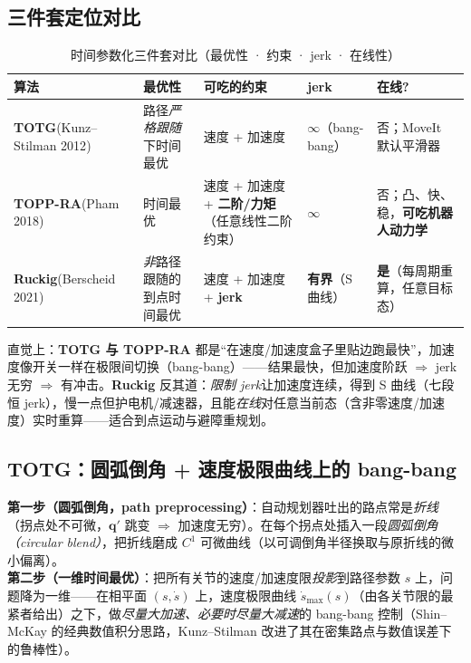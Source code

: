 \subsection{三件套定位对比}
\label{subsec:at-trio}

\begin{table}[H]\centering\small
\caption{时间参数化三件套对比（最优性 · 约束 · jerk · 在线性）}
\label{tab:at-trio}
\begin{tabular}{p{} p{} p{} p{} p{}}
\toprule
算法 & 最优性 & 可吃的约束 & jerk & 在线? \\
\midrule
\textbf{TOTG}\newline (Kunz--Stilman 2012\cite{kunz2012totg}) & 路径\emph{严格跟随}下时间最优 & 速度 + 加速度 & $\infty$（bang-bang） & 否；MoveIt 默认平滑器 \\
\textbf{TOPP-RA}\newline (Pham 2018\cite{pham2018toppra}) & 时间最优 & 速度 + 加速度 + \textbf{二阶/力矩}（任意线性二阶约束） & $\infty$ & 否；凸、快、稳，\textbf{可吃机器人动力学} \\
\textbf{Ruckig}\newline (Berscheid 2021\cite{berscheid2021ruckig}) & \emph{非}路径跟随的到点时间最优 & 速度 + 加速度 + \textbf{jerk} & \textbf{有界}（S 曲线） & \textbf{是}（每周期重算，任意目标态） \\
\bottomrule
\end{tabular}
\end{table}

直觉上：\textbf{TOTG 与 TOPP-RA} 都是“在速度/加速度盒子里贴边跑最快”，加速度像开关一样在极限间切换（bang-bang）——结果最快，但加速度阶跃 $\Rightarrow$ jerk 无穷 $\Rightarrow$ 有冲击。\textbf{Ruckig} 反其道：\emph{限制 jerk}让加速度连续，得到 S 曲线（七段恒 jerk），慢一点但护电机/减速器，且能\emph{在线}对任意当前态（含非零速度/加速度）实时重算——适合到点运动与避障重规划。

\subsection{TOTG：圆弧倒角 + 速度极限曲线上的 bang-bang}
\label{subsec:at-totg}

\begin{algo}\label{alg:at-totg}
\textbf{第一步（圆弧倒角，path preprocessing）}：自动规划器吐出的路点常是\emph{折线}（拐点处不可微，$\mathbf{q}'$ 跳变 $\Rightarrow$ 加速度无穷）。在每个拐点处插入一段\emph{圆弧倒角（circular blend）}，把折线磨成 $C^1$ 可微曲线（以可调倒角半径换取与原折线的微小偏离）。\\
\textbf{第二步（一维时间最优）}：把所有关节的速度/加速度限\emph{投影}到路径参数 $s$ 上，问题降为一维——在相平面 $(s,\dot s)$ 上，速度极限曲线 $\dot s_{\max}(s)$（由各关节限的最紧者给出）之下，做\emph{尽量大加速、必要时尽量大减速}的 bang-bang 控制（Shin--McKay 的经典数值积分思路，Kunz--Stilman 改进了其在密集路点与数值误差下的鲁棒性）。
\end{algo}

